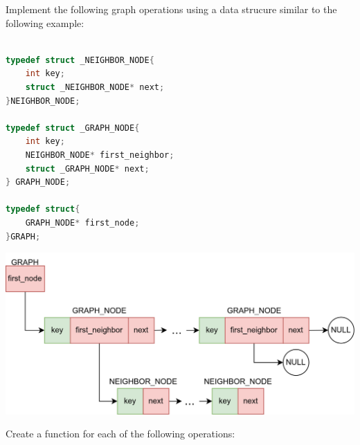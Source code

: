 \documentclass{exam}
\newcommand\lvlez{$\bigstar$}
\newcommand\lvlmed{\lvlez\lvlez}
\begin{document}
\begin{questions}

\newpage
\question Implement the following graph operations using a data strucure similar to the following example:

\begin{lstlisting}[language=C]

typedef struct _NEIGHBOR_NODE{
    int key;
    struct _NEIGHBOR_NODE* next;
}NEIGHBOR_NODE;

typedef struct _GRAPH_NODE{
    int key;
    NEIGHBOR_NODE* first_neighbor;
    struct _GRAPH_NODE* next;
} GRAPH_NODE;

typedef struct{
    GRAPH_NODE* first_node;    
}GRAPH;
\end{lstlisting}


\includegraphics[width=\textwidth]{diagrams/digraph1.drawio.png}

Create a function for each of the following operations:
\end{questions}
\end{document}
